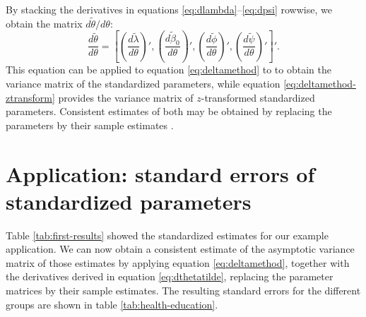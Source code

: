 \documentclass[a4paper,11pt]{article}
\renewcommand{\l}{\lambda}
\renewcommand{\b}{\beta}
\newcommand{\thetastan}{\tilde{\theta}}
\newcommand{\0}{\boldsymbol{0}}
\begin{document}
By stacking the derivatives in equations \ref{eq:dlambda}--\ref{eq:dpsi} rowwise, we obtain the matrix $d \thetastan / d \theta$:
\begin{equation}\label{eq:dthetatilde}
\frac{d \thetastan}{d \theta} = [
\left( \frac{d \tilde\l}{d \theta} \right)',
\left( \frac{d \tilde\b_0}{d \theta} \right)',
\left( \frac{d \tilde{\phi}}{d \theta} \right)',
\left( \frac{d \tilde{\psi}}{d \theta}\right)'
]'.
\end{equation}
This equation can be applied to equation \ref{eq:deltamethod} to 
to obtain the variance matrix of the standardized parameters, while equation \ref{eq:deltamethod-ztransform}
provides the variance matrix of $z$-transformed standardized parameters.
Consistent estimates of both may be obtained by replacing the parameters by their sample estimates \citep{satorra1989alternative}.


\section{Application: standard errors of standardized parameters\label{sec:application}}

Table  \ref{tab:first-results} showed the standardized estimates for our example application. We can now obtain 
a consistent estimate of the asymptotic variance matrix of those estimates 
by applying equation \ref{eq:deltamethod}, together with the derivatives derived in equation \ref{eq:dthetatilde},
replacing the parameter matrices by their sample estimates. 
The resulting standard errors for the different groups are shown in table \ref{tab:health-education}.
\end{document}
